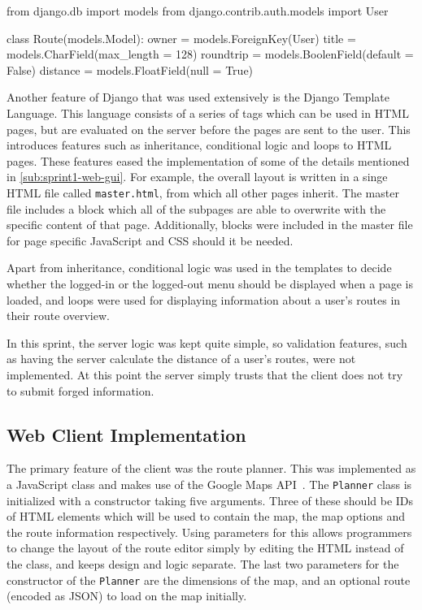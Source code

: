 \begin{code}[language={Python}, label={lst:sprint1-route-model}, caption={The ``Route'' Model}]
from django.db import models
from django.contrib.auth.models import User

class Route(models.Model):
	owner = models.ForeignKey(User)
	title = models.CharField(max_length = 128)
	roundtrip = models.BoolenField(default = False)
	distance = models.FloatField(null = True)
\end{code}

Another feature of Django that was used extensively is the Django Template Language. This language consists of a series of tags which can be used in \ac{HTML} pages, but are evaluated on the server before the pages are sent to the user. This introduces features such as inheritance, conditional logic and loops to \ac{HTML} pages. These features eased the implementation of some of the details mentioned in \autoref{sub:sprint1-web-gui}. For example, the overall layout is written in a singe \ac{HTML} file called \texttt{master.html}, from which all other pages inherit. The master file includes a block which all of the subpages are able to overwrite with the specific content of that page. Additionally, blocks were included in the master file for page specific JavaScript and \ac{CSS} should it be needed.

Apart from inheritance, conditional logic was used in the templates to decide whether the logged-in or the logged-out menu should be displayed when a page is loaded, and loops were used for displaying information about a user's routes in their route overview.

In this sprint, the server logic was kept quite simple, so validation features, such as having the server calculate the distance of a user's routes, were not implemented. At this point the server simply trusts that the client does not try to submit forged information.

\subsection{Web Client Implementation}

The primary feature of the client was the route planner. This was implemented as a JavaScript class and makes use of the Google Maps \ac{API}~\citep{gmapsapi}. The \texttt{Planner} class is initialized with a constructor taking five arguments. Three of these should be IDs of \ac{HTML} elements which will be used to contain the map, the map options and the route information respectively. Using parameters for this allows programmers to change the layout of the route editor simply by editing the \ac{HTML} instead of the class, and keeps design and logic separate. The last two parameters for the constructor of the \texttt{Planner} are the dimensions of the map, and an optional route (encoded as \ac{JSON}) to load on the map initially.

